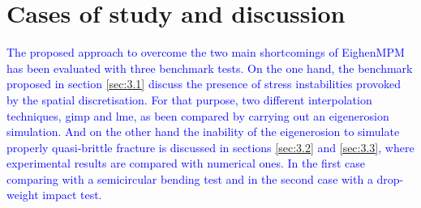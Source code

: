 \documentclass[preprint,12pt,a4paper]{elsarticle}
\begin{document}
\section{Cases of study and discussion}
\label{sec:3}

\textcolor{blue}{The proposed approach to overcome the two main shortcomings of
EighenMPM  has been evaluated with three benchmark tests. On the one hand, the benchmark proposed in section \ref{sec:3.1} discuss the presence of stress instabilities provoked by the spatial discretisation. For that purpose, two different interpolation techniques, \acrshort{gimp} and \acrshort{lme}, as been compared by carrying out an eigenerosion simulation. And on the other hand the inability of the eigenerosion to simulate properly quasi-brittle fracture is discussed in sections \ref{sec:3.2} and \ref{sec:3.3}, where experimental results are compared with numerical ones. In the first case comparing with a semicircular bending test and in the second case with a drop-weight impact test.}
\end{document}
